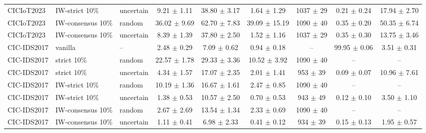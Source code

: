 \begin{table}[t]
\begin{tabular}{lllcccccc}
CICIoT2023 & IW-strict 10\% & uncertain & 9.21 $\pm$ 1.11 & 38.80 $\pm$ 3.17 & 1.64 $\pm$ 1.29 & 1037 $\pm$ 29 & 0.21 $\pm$ 0.24 & 17.94 $\pm$ 2.70 \\
CICIoT2023 & IW-consensus 10\% & random & 36.02 $\pm$ 9.69 & 62.70 $\pm$ 7.83 & 39.09 $\pm$ 15.19 & 1090 $\pm$ 40 & 0.35 $\pm$ 0.20 & 50.35 $\pm$ 6.74 \\
CICIoT2023 & IW-consensus 10\% & uncertain & 8.39 $\pm$ 1.39 & 37.80 $\pm$ 2.50 & 1.52 $\pm$ 1.16 & 1037 $\pm$ 29 & 0.35 $\pm$ 0.30 & 13.75 $\pm$ 3.46 \\
CIC-IDS2017 & vanilla & -- & 2.48 $\pm$ 0.29 & 7.09 $\pm$ 0.62 & 0.94 $\pm$ 0.18 & -- & 99.95 $\pm$ 0.06 & 3.51 $\pm$ 0.31 \\
CIC-IDS2017 & strict 10\% & random & 22.57 $\pm$ 1.78 & 29.33 $\pm$ 3.36 & 10.52 $\pm$ 3.92 & 1090 $\pm$ 40 & -- & -- \\
CIC-IDS2017 & strict 10\% & uncertain & 4.34 $\pm$ 1.57 & 17.07 $\pm$ 2.35 & 2.01 $\pm$ 1.41 & 953 $\pm$ 39 & 0.09 $\pm$ 0.07 & 10.96 $\pm$ 7.61 \\
CIC-IDS2017 & IW-strict 10\% & random & 10.19 $\pm$ 1.36 & 16.67 $\pm$ 1.61 & 2.47 $\pm$ 0.85 & 1090 $\pm$ 40 & -- & -- \\
CIC-IDS2017 & IW-strict 10\% & uncertain & 1.38 $\pm$ 0.53 & 10.57 $\pm$ 2.50 & 0.70 $\pm$ 0.53 & 943 $\pm$ 49 & 0.12 $\pm$ 0.10 & 3.50 $\pm$ 1.10 \\
CIC-IDS2017 & IW-consensus 10\% & random & 2.67 $\pm$ 2.69 & 13.54 $\pm$ 1.34 & 2.33 $\pm$ 0.69 & 1090 $\pm$ 40 & -- & -- \\
CIC-IDS2017 & IW-consensus 10\% & uncertain & 1.11 $\pm$ 0.41 & 6.98 $\pm$ 2.33 & 0.41 $\pm$ 0.12 & 934 $\pm$ 39 & 0.15 $\pm$ 0.13 & 1.95 $\pm$ 0.57 \\
\bottomrule
\end{tabular}
\end{table}
